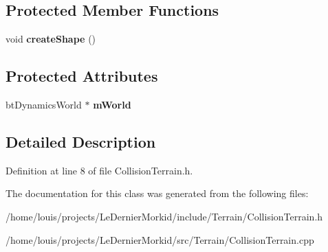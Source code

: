 \subsection*{Protected Member Functions}
\begin{DoxyCompactItemize}
\item 
\mbox{\label{class_collision_terrain_a0641937303366dd4576a5ad308513e9b}} 
void {\bfseries create\+Shape} ()
\end{DoxyCompactItemize}
\subsection*{Protected Attributes}
\begin{DoxyCompactItemize}
\item 
\mbox{\label{class_collision_terrain_a51867cf4e61b0170fdbe81b7b7a84870}} 
bt\+Dynamics\+World $\ast$ {\bfseries m\+World}
\end{DoxyCompactItemize}


\subsection{Detailed Description}


Definition at line 8 of file Collision\+Terrain.\+h.



The documentation for this class was generated from the following files\+:\begin{DoxyCompactItemize}
\item 
/home/louis/projects/\+Le\+Dernier\+Morkid/include/\+Terrain/Collision\+Terrain.\+h\item 
/home/louis/projects/\+Le\+Dernier\+Morkid/src/\+Terrain/Collision\+Terrain.\+cpp\end{DoxyCompactItemize}
